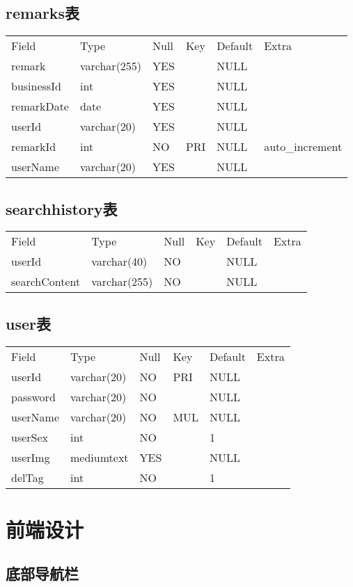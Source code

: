 \subsection{remarks表}

\begin{longtable}[]{@{}llllll@{}}
\toprule
Field & Type & Null & Key & Default & Extra\tabularnewline
remark & varchar(255) & YES & & NULL &\tabularnewline
businessId & int & YES & & NULL &\tabularnewline
remarkDate & date & YES & & NULL &\tabularnewline
userId & varchar(20) & YES & & NULL &\tabularnewline
remarkId & int & NO & PRI & NULL & auto\_increment\tabularnewline
userName & varchar(20) & YES & & NULL &\tabularnewline
\bottomrule
\end{longtable}

\subsection{searchhistory表}

\begin{longtable}[]{@{}llllll@{}}
\toprule
Field & Type & Null & Key & Default & Extra\tabularnewline
userId & varchar(40) & NO & & NULL &\tabularnewline
searchContent & varchar(255) & NO & & NULL &\tabularnewline
\bottomrule
\end{longtable}

\subsection{user表}

\begin{longtable}[]{@{}llllll@{}}
\toprule
Field & Type & Null & Key & Default & Extra\tabularnewline
userId & varchar(20) & NO & PRI & NULL &\tabularnewline
password & varchar(20) & NO & & NULL &\tabularnewline
userName & varchar(20) & NO & MUL & NULL &\tabularnewline
userSex & int & NO & & 1 &\tabularnewline
userImg & mediumtext & YES & & NULL &\tabularnewline
delTag & int & NO & & 1 &\tabularnewline
\bottomrule
\end{longtable}


\section{前端设计}

\subsection{底部导航栏}
    


